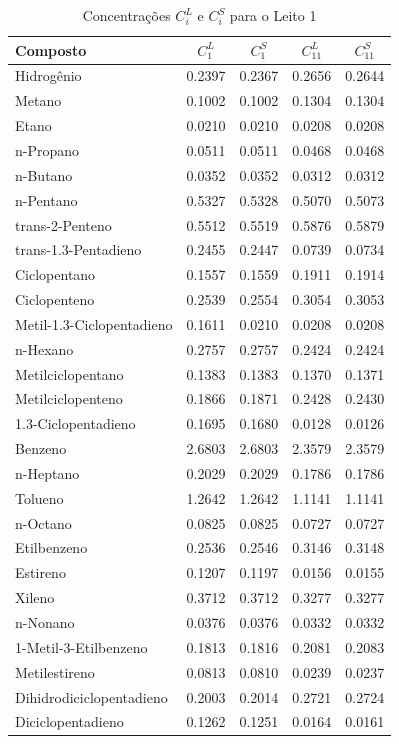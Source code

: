 \begin{table}[!htb]
\begin{center}
\caption{Concentrações $C^L_{i}$ e $C^S_{i}$ para o Leito 1}
\label{tab:concentraçõesparaoleito1}
\small
\begin{tabular}{lcccc}
{Composto} & {$C^{L}_{1}$} & {$C^{S}_{1}$} & {$C^{L}_{11}$} & {$C^{S}_{11}$}
\\
\hline
{Hidrogênio} & 0.2397 & 0.2367 & 0.2656 & 0.2644 \\
{Metano} & 0.1002 & 0.1002 & 0.1304 & 0.1304 \\
{Etano} & 0.0210 & 0.0210 & 0.0208 & 0.0208 \\
{n-Propano} & 0.0511 & 0.0511 & 0.0468 & 0.0468 \\
{n-Butano} & 0.0352 & 0.0352 & 0.0312 & 0.0312 \\
{n-Pentano} & 0.5327 & 0.5328 & 0.5070 & 0.5073 \\
{trans-2-Penteno} & 0.5512 & 0.5519 & 0.5876 & 0.5879 \\
{trans-1.3-Pentadieno} & 0.2455 & 0.2447 & 0.0739 & 0.0734 \\
{Ciclopentano} & 0.1557 & 0.1559 & 0.1911 & 0.1914 \\
{Ciclopenteno} & 0.2539 & 0.2554 & 0.3054 & 0.3053 \\
{Metil-1.3-Ciclopentadieno} & 0.1611 & 0.0210 & 0.0208 & 0.0208 \\
{n-Hexano} & 0.2757 & 0.2757 & 0.2424 & 0.2424 \\
{Metilciclopentano} & 0.1383 & 0.1383 & 0.1370 & 0.1371 \\
{Metilciclopenteno} & 0.1866 & 0.1871 & 0.2428 & 0.2430 \\
{1.3-Ciclopentadieno} & 0.1695 & 0.1680 & 0.0128 & 0.0126 \\
{Benzeno} & 2.6803 & 2.6803 & 2.3579 & 2.3579 \\
{n-Heptano} & 0.2029 & 0.2029 & 0.1786 & 0.1786 \\
{Tolueno} & 1.2642 & 1.2642 & 1.1141 & 1.1141 \\
{n-Octano} & 0.0825 & 0.0825 & 0.0727 & 0.0727 \\
{Etilbenzeno} & 0.2536 & 0.2546 & 0.3146 & 0.3148 \\
{Estireno} & 0.1207 & 0.1197 & 0.0156 & 0.0155 \\
{Xileno} & 0.3712 & 0.3712 & 0.3277 & 0.3277 \\
{n-Nonano} & 0.0376 & 0.0376 & 0.0332 & 0.0332 \\
{1-Metil-3-Etilbenzeno} & 0.1813 & 0.1816 & 0.2081 & 0.2083 \\
{Metilestireno} & 0.0813 & 0.0810 & 0.0239 & 0.0237 \\
{Dihidrodiciclopentadieno} & 0.2003 & 0.2014 & 0.2721 & 0.2724 \\
{Diciclopentadieno} & 0.1262 & 0.1251 & 0.0164 & 0.0161 \\
\bottomrule
\end{tabular}
\end{center}
\end{table}

